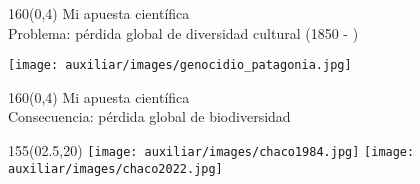 \documentclass[shownotes,aspectratio=169]{beamer}
\begin{document}
\begin{frame}[plain]
\begin{textblock}{160}(0,4)
 \centering \LARGE Mi apuesta científica \\
 \Large Problema: pérdida global de diversidad cultural (1850 - )
 \end{textblock}
\vspace{1.25cm} \centering

\texttt{[image: auxiliar/images/genocidio\_patagonia.jpg]}


\end{frame}


\begin{frame}[plain]
\begin{textblock}{160}(0,4)
 \centering \LARGE Mi apuesta científica \\
 \Large Consecuencia: pérdida global de biodiversidad 
 \end{textblock}
\vspace{1.25cm} \centering


\begin{textblock}{155}(02.5,20)
 \centering
\texttt{[image: auxiliar/images/chaco1984.jpg]}
\texttt{[image: auxiliar/images/chaco2022.jpg]}
\end{textblock}

\end{frame}
% 
% 
% 
% 
% 
\end{document}
